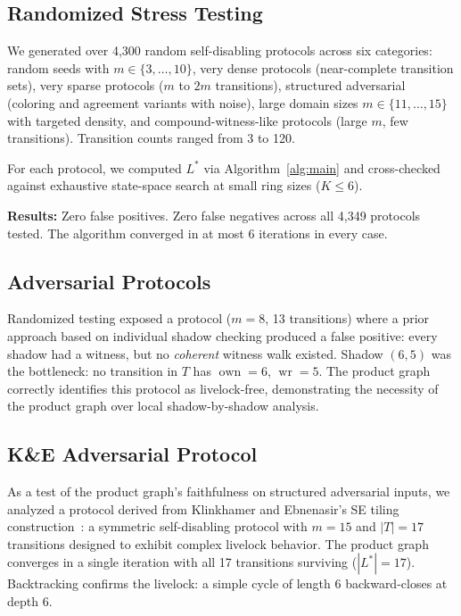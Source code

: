 \documentclass[11pt]{article}
\begin{document}
\subsection{Randomized Stress Testing}

We generated over 4{,}300 random self-disabling protocols across six categories: random seeds with $m \in \{3, \ldots, 10\}$, very dense protocols (near-complete transition sets), very sparse protocols ($m$ to $2m$ transitions), structured adversarial (coloring and agreement variants with noise), large domain sizes $m \in \{11, \ldots, 15\}$ with targeted density, and compound-witness-like protocols (large $m$, few transitions). Transition counts ranged from 3 to 120.

For each protocol, we computed $L^*$ via Algorithm~\ref{alg:main} and cross-checked against exhaustive state-space search at small ring sizes ($K \leq 6$).

\textbf{Results:} Zero false positives. Zero false negatives across all 4{,}349 protocols tested. The algorithm converged in at most 6 iterations in every case.

\subsection{Adversarial Protocols}

Randomized testing exposed a protocol ($m = 8$, 13 transitions) where a prior approach based on individual shadow checking produced a false positive: every shadow had a witness, but no \emph{coherent} witness walk existed. Shadow $(6, 5)$ was the bottleneck: no transition in $T$ has $\operatorname{own} = 6$, $\operatorname{wr} = 5$. The product graph correctly identifies this protocol as livelock-free, demonstrating the necessity of the product graph over local shadow-by-shadow analysis.

\subsection{K\&E Adversarial Protocol}

As a test of the product graph's faithfulness on structured adversarial inputs, we analyzed a protocol derived from Klinkhamer and Ebnenasir's SE tiling construction~\cite{klinkhamer-tr}: a symmetric self-disabling protocol with $m = 15$ and $|T| = 17$ transitions designed to exhibit complex livelock behavior. The product graph converges in a single iteration with all 17 transitions surviving ($|L^*| = 17$). Backtracking confirms the livelock: a simple cycle of length 6 backward-closes at depth 6.
\end{document}
